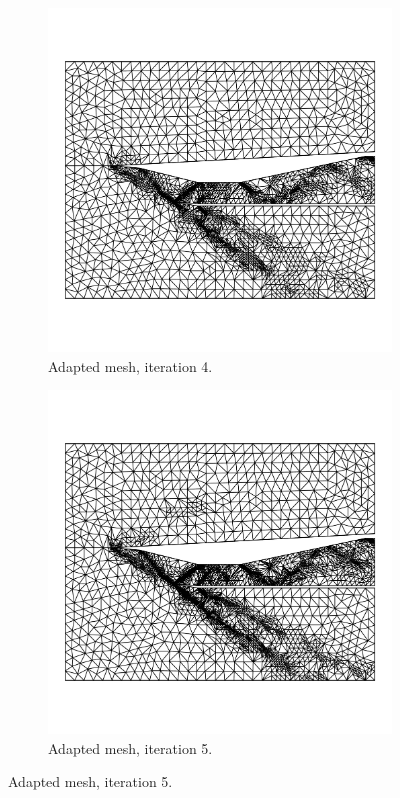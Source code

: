 \begin{figure}[h!]
    \begin{subfigure}[h]{0.39\linewidth}
        \centering
        \includegraphics[width=\linewidth]{rep/q4/mesh4.pdf}
        \caption{Adapted mesh, iteration 4.}
    \end{subfigure}
    \begin{subfigure}[h]{0.39\linewidth}
        \centering
        \includegraphics[width=\linewidth]{rep/q4/mesh5.pdf}
        \caption{Adapted mesh, iteration 5.}
    \end{subfigure}
\end{figure}

